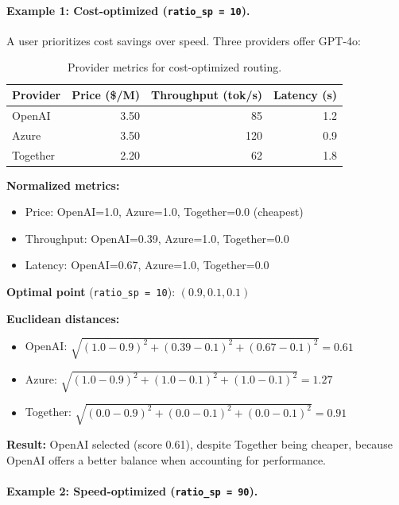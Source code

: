 \documentclass[english]{article}
\begin{document}
\paragraph{Example 1: Cost-optimized (\texttt{ratio\_sp = 10}).}

A user prioritizes cost savings over speed. Three providers offer GPT-4o:

\begin{table}[H]
\centering
\caption{Provider metrics for cost-optimized routing.}
\begin{tabular}{|l|r|r|r|}
\hline
\textbf{Provider} & \textbf{Price (\$/M)} & \textbf{Throughput (tok/s)} & \textbf{Latency (s)} \\
\hline
OpenAI & 3.50 & 85 & 1.2 \\
Azure & 3.50 & 120 & 0.9 \\
Together & 2.20 & 62 & 1.8 \\
\hline
\end{tabular}
\end{table}

\textbf{Normalized metrics:}
\begin{itemize}
    \item Price: OpenAI=1.0, Azure=1.0, Together=0.0 (cheapest)
    \item Throughput: OpenAI=0.39, Azure=1.0, Together=0.0
    \item Latency: OpenAI=0.67, Azure=1.0, Together=0.0
\end{itemize}

\textbf{Optimal point} (\texttt{ratio\_sp = 10}): $(0.9, 0.1, 0.1)$

\textbf{Euclidean distances:}
\begin{itemize}
    \item OpenAI: $\sqrt{(1.0-0.9)^2 + (0.39-0.1)^2 + (0.67-0.1)^2} = 0.61$
    \item Azure: $\sqrt{(1.0-0.9)^2 + (1.0-0.1)^2 + (1.0-0.1)^2} = 1.27$
    \item Together: $\sqrt{(0.0-0.9)^2 + (0.0-0.1)^2 + (0.0-0.1)^2} = 0.91$
\end{itemize}

\textbf{Result:} OpenAI selected (score 0.61), despite Together being cheaper, because OpenAI offers a better balance when accounting for performance.

\paragraph{Example 2: Speed-optimized (\texttt{ratio\_sp = 90}).}
\end{document}
